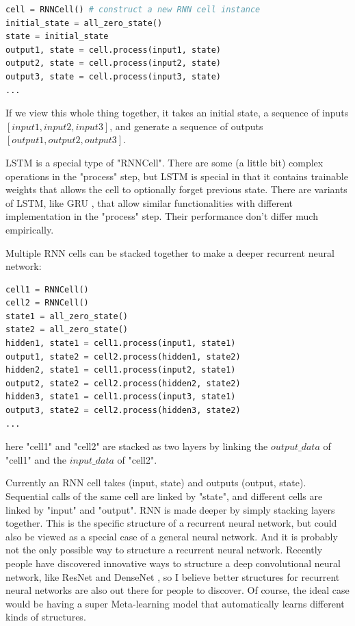 \documentclass[a4paper]{article}
\begin{document}
\begin{lstlisting}[language=Python]
cell = RNNCell() # construct a new RNN cell instance
initial_state = all_zero_state()
state = initial_state
output1, state = cell.process(input1, state)
output2, state = cell.process(input2, state)
output3, state = cell.process(input3, state)
...
\end{lstlisting}

If we view this whole thing together, it takes an initial state, a sequence of inputs $[input1, input2, input3]$, and generate a sequence of outputs $[output1, output2, output3]$.

LSTM\citep{hochreiter1997long} is a special type of "RNNCell". There are some (a little bit) complex operations in the "process" step, but LSTM is special in that it contains trainable weights that allows the cell to optionally forget previous state. There are variants of LSTM, like GRU \citep{chung2014empirical}, that allow similar functionalities with different implementation in the "process" step. Their performance don't differ much empirically.

Multiple RNN cells can be stacked together to make a deeper recurrent neural network:
\begin{lstlisting}[language=Python]
cell1 = RNNCell()
cell2 = RNNCell()
state1 = all_zero_state()
state2 = all_zero_state()
hidden1, state1 = cell1.process(input1, state1)
output1, state2 = cell2.process(hidden1, state2)
hidden2, state1 = cell1.process(input2, state1)
output2, state2 = cell2.process(hidden2, state2)
hidden3, state1 = cell1.process(input3, state1)
output3, state2 = cell2.process(hidden3, state2)
...
\end{lstlisting}
here "cell1" and "cell2" are stacked as two layers by linking the $output\_data$ of "cell1" and the $input\_data$ of "cell2". 

Currently an RNN cell takes (input, state) and outputs (output, state). Sequential calls of the same cell are linked by "state", and different cells are linked by "input" and "output". RNN is made deeper by simply stacking layers together. This is the specific structure of a recurrent neural network, but could also be viewed as a special case of a general neural network. And it is probably not the only possible way to structure a recurrent neural network. Recently people have discovered innovative ways to structure a deep convolutional neural network, like ResNet \citep{he2016deep} and DenseNet \citep{huang2016densely}, so I believe better structures for recurrent neural networks are also out there for people to discover. Of course, the ideal case would be having a super Meta-learning model that automatically learns different kinds of structures.
\end{document}
